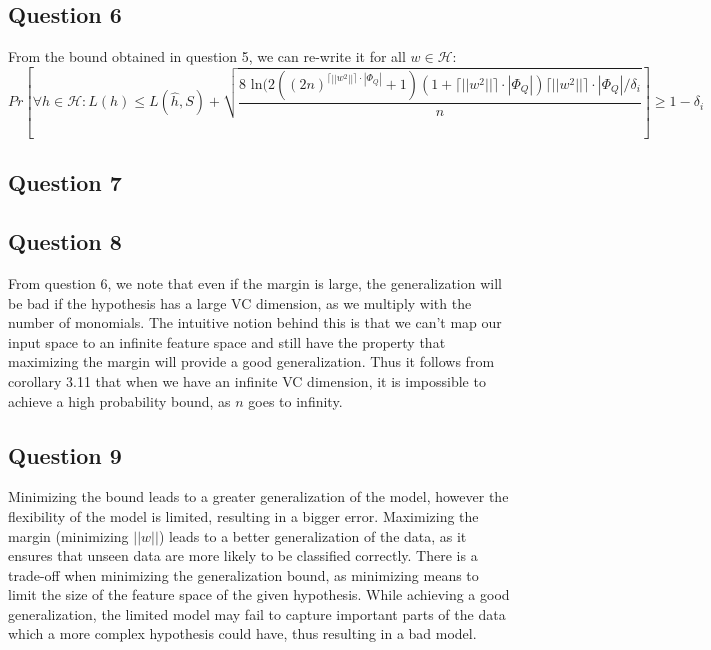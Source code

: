 \documentclass{article}
\begin{document}
\subsection{Question 6}
From the bound obtained in question 5, we can re-write it for all $w \in \mathcal{H}$:
\begin{equation}
Pr \left[ \forall h \in \mathcal{H}: L(h) \leq L(\hat{h},S)+
\sqrt{ \dfrac{8 \text{ ln} (2((2n)^{\lceil || w^2|| \rceil \cdot| \Phi_Q|}+1) (1+ \lceil || w^2|| \rceil \cdot| \Phi_Q|) \lceil || w^2|| \rceil \cdot| \Phi_Q|  / \delta_i}{n}} \right] \geq 1- \delta_i 
\end{equation} 
\subsection{Question 7}

\subsection{Question 8}
From question 6, we note that even if the margin is large, the generalization will be bad if the hypothesis has a large VC dimension, as we multiply with the number of monomials. The intuitive notion behind this is that we can't map our input space to an infinite feature space and still have the property that maximizing the margin will provide a good generalization. Thus it follows from corollary 3.11 that when we have an infinite VC dimension, it is impossible to achieve a high probability bound, as $n$ goes to infinity. 
\subsection{Question 9}
Minimizing the bound leads to a greater generalization of the model, however the flexibility of the model is limited, resulting in a bigger error. Maximizing the margin (minimizing $||w||$) leads to a better generalization of the data, as it ensures that unseen data are more likely to be classified correctly. There is a trade-off when minimizing the generalization bound, as minimizing means to limit the size of the feature space of the given hypothesis. While achieving a good generalization, the limited model may fail to capture important parts of the data which a more complex hypothesis could have, thus resulting in a bad model. 
\end{document}
